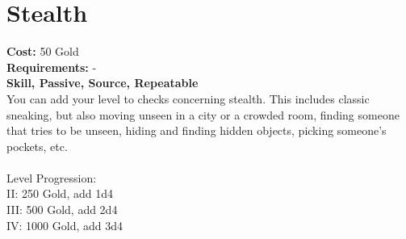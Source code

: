 \section*{Stealth}
\textbf{Cost:} 50 Gold\\
\textbf{Requirements:} -\\
\textbf{Skill, Passive, Source, Repeatable}\\
You can add your level to checks concerning stealth. This includes classic sneaking, but also moving unseen in a city or a crowded room, finding someone that tries to be unseen, hiding and finding hidden objects, picking someone's pockets, etc.\\
\\
Level Progression:\\
II: 250 Gold, add 1d4\\
III: 500 Gold, add 2d4\\
IV: 1000 Gold, add 3d4\\